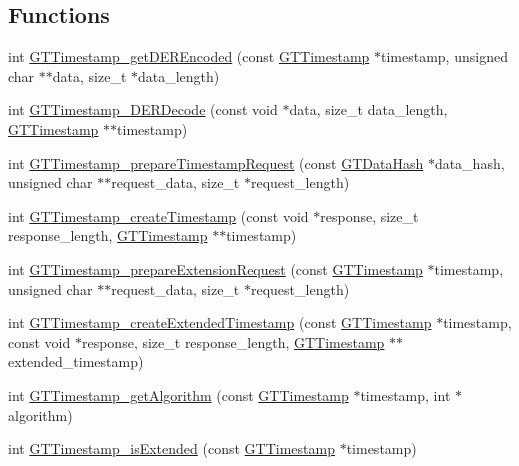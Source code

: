 \subsection*{Functions}
\begin{DoxyCompactItemize}
\item 
int \hyperlink{group__timestamps_ga58dca66e7a9b95b22d65fba870b23b7c}{GTTimestamp\_\-getDEREncoded} (const \hyperlink{group__timestamps_gaddb792efe52216386853c94e7aeaf6ba}{GTTimestamp} $\ast$timestamp, unsigned char $\ast$$\ast$data, size\_\-t $\ast$data\_\-length)
\item 
int \hyperlink{group__timestamps_ga3215673483c473abcf6fe7dd6b7151b2}{GTTimestamp\_\-DERDecode} (const void $\ast$data, size\_\-t data\_\-length, \hyperlink{group__timestamps_gaddb792efe52216386853c94e7aeaf6ba}{GTTimestamp} $\ast$$\ast$timestamp)
\item 
int \hyperlink{group__timestamps_gabff8b301b58b0ce0602b128e4bac05f6}{GTTimestamp\_\-prepareTimestampRequest} (const \hyperlink{struct_g_t_message_digest__st}{GTDataHash} $\ast$data\_\-hash, unsigned char $\ast$$\ast$request\_\-data, size\_\-t $\ast$request\_\-length)
\item 
int \hyperlink{group__timestamps_ga135b81ff9a23081b3438c224f7388424}{GTTimestamp\_\-createTimestamp} (const void $\ast$response, size\_\-t response\_\-length, \hyperlink{group__timestamps_gaddb792efe52216386853c94e7aeaf6ba}{GTTimestamp} $\ast$$\ast$timestamp)
\item 
int \hyperlink{group__timestamps_ga983d529528937553b716168b57aa29ee}{GTTimestamp\_\-prepareExtensionRequest} (const \hyperlink{group__timestamps_gaddb792efe52216386853c94e7aeaf6ba}{GTTimestamp} $\ast$timestamp, unsigned char $\ast$$\ast$request\_\-data, size\_\-t $\ast$request\_\-length)
\item 
int \hyperlink{group__timestamps_ga472426871678c08c1a4ad00bbb43efc7}{GTTimestamp\_\-createExtendedTimestamp} (const \hyperlink{group__timestamps_gaddb792efe52216386853c94e7aeaf6ba}{GTTimestamp} $\ast$timestamp, const void $\ast$response, size\_\-t response\_\-length, \hyperlink{group__timestamps_gaddb792efe52216386853c94e7aeaf6ba}{GTTimestamp} $\ast$$\ast$extended\_\-timestamp)
\item 
int \hyperlink{group__timestamps_ga00fbe27df09c87517479d068afaf11a0}{GTTimestamp\_\-getAlgorithm} (const \hyperlink{group__timestamps_gaddb792efe52216386853c94e7aeaf6ba}{GTTimestamp} $\ast$timestamp, int $\ast$algorithm)
\item 
int \hyperlink{group__timestamps_ga4f4d4ffa1ccd17c7bbb290e54806b8c2}{GTTimestamp\_\-isExtended} (const \hyperlink{group__timestamps_gaddb792efe52216386853c94e7aeaf6ba}{GTTimestamp} $\ast$timestamp)

\end{DoxyCompactItemize}
